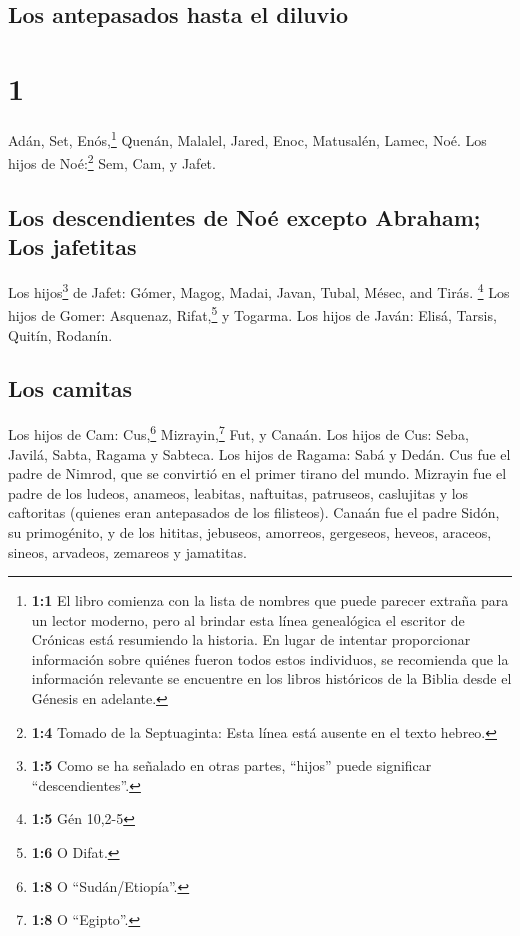 \hypertarget{los-antepasados-hasta-el-diluvio}{%
\subsection{Los antepasados \hspace{0pt}\hspace{0pt}hasta el
diluvio}\label{los-antepasados-hasta-el-diluvio}}

\hypertarget{section}{%
\section{1}\label{section}}

 Adán, Set, Enós,\footnote{\textbf{1:1} El libro comienza
  con la lista de nombres que puede parecer extraña para un lector
  moderno, pero al brindar esta línea genealógica el escritor de
  Crónicas está resumiendo la historia. En lugar de intentar
  proporcionar información sobre quiénes fueron todos estos individuos,
  se recomienda que la información relevante se encuentre en los libros
  históricos de la Biblia desde el Génesis en adelante.} 
Quenán, Malalel, Jared,  Enoc, Matusalén, Lamec, Noé.
 Los hijos de Noé:\footnote{\textbf{1:4} Tomado de la
  Septuaginta: Esta línea está ausente en el texto hebreo.} Sem, Cam, y
Jafet.

\hypertarget{los-descendientes-de-nouxe9-excepto-abraham-los-jafetitas}{%
\subsection{Los descendientes de Noé excepto Abraham; Los
jafetitas}\label{los-descendientes-de-nouxe9-excepto-abraham-los-jafetitas}}

 Los hijos\footnote{\textbf{1:5} Como se ha señalado en
  otras partes, ``hijos'' puede significar ``descendientes''.} de Jafet:
Gómer, Magog, Madai, Javan, Tubal, Mésec, and Tirás. \footnote{\textbf{1:5}
  Gén 10,2-5}  Los hijos de Gomer: Asquenaz,
Rifat,\footnote{\textbf{1:6} O Difat.} y Togarma.  Los
hijos de Javán: Elisá, Tarsis, Quitín, Rodanín.

\hypertarget{los-camitas}{%
\subsection{Los camitas}\label{los-camitas}}

 Los hijos de Cam: Cus,\footnote{\textbf{1:8} O
  ``Sudán/Etiopía''.} Mizrayin,\footnote{\textbf{1:8} O ``Egipto''.}
Fut, y Canaán.  Los hijos de Cus: Seba, Javilá, Sabta,
Ragama y Sabteca. Los hijos de Ragama: Sabá y Dedán.  Cus
fue el padre de Nimrod, que se convirtió en el primer tirano del mundo.
 Mizrayin fue el padre de los ludeos, anameos, leabitas,
naftuitas,  patruseos, caslujitas y los caftoritas
(quienes eran antepasados de los filisteos).  Canaán fue
el padre Sidón, su primogénito, y de los hititas, 
jebuseos, amorreos, gergeseos,  heveos, araceos, sineos,
 arvadeos, zemareos y jamatitas.

